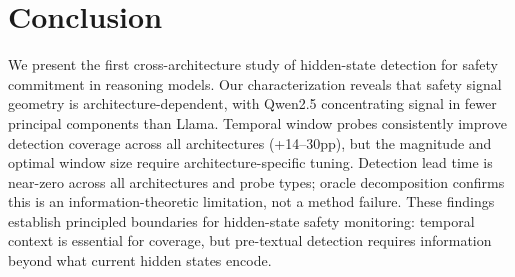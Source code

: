 \documentclass[11pt,a4paper]{article}
\begin{document}
\section{Conclusion}
\label{sec:conclusion}

We present the first cross-architecture study of hidden-state detection for safety commitment in reasoning models.
Our characterization reveals that safety signal geometry is architecture-dependent, with Qwen2.5 concentrating signal in fewer principal components than Llama.
Temporal window probes consistently improve detection coverage across all architectures (+14--30pp), but the magnitude and optimal window size require architecture-specific tuning.
Detection lead time is near-zero across all architectures and probe types; oracle decomposition confirms this is an information-theoretic limitation, not a method failure.
These findings establish principled boundaries for hidden-state safety monitoring: temporal context is essential for coverage, but pre-textual detection requires information beyond what current hidden states encode.



\end{document}
